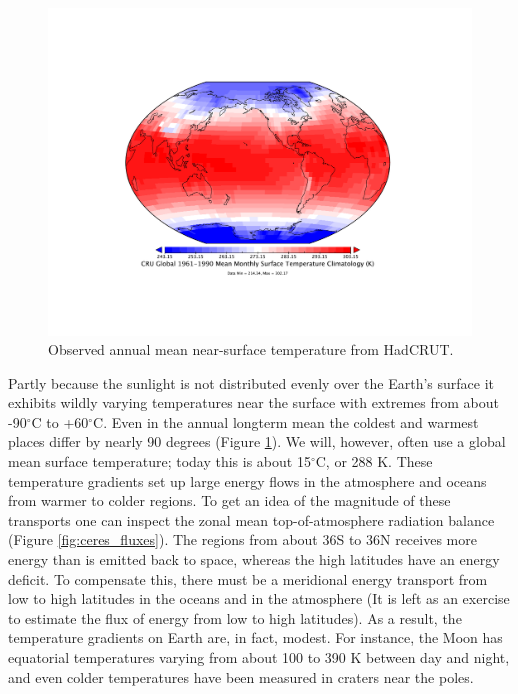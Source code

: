 \documentclass[12pt]{book}
\begin{document}
\begin{figure}
\begin{center}
\includegraphics[width=12 cm]{../external_figures/HadCRUT_absolute_timmean.pdf}
\end{center}
\caption{ Observed annual mean near-surface temperature from HadCRUT. } 
\label{fig:HadCRUT_temperature_map}
\end{figure}

Partly because the sunlight is not distributed evenly over the Earth's surface it exhibits wildly varying temperatures near the surface with extremes from about -90$^\circ$C to +60$^\circ$C. Even in the annual longterm mean the coldest and warmest places differ by nearly 90 degrees (Figure \ref{fig:HadCRUT_temperature_map}). We will, however, often use a global mean surface temperature; today this is about 15$^\circ$C, or 288 K. These temperature gradients set up large energy flows in the atmosphere and oceans from warmer to colder regions. To get an idea of the magnitude of these transports one can inspect the zonal mean top-of-atmosphere radiation balance (Figure \ref{fig:ceres_fluxes}). The regions from about 36S to 36N receives more energy than is emitted back to space, whereas the high latitudes have an energy deficit. To compensate this, there must be a meridional energy transport from low to high latitudes in the oceans and in the atmosphere (It is left as an exercise to estimate the flux of energy from low to high latitudes). As a result, the temperature gradients on Earth are, in fact, modest. For instance, the Moon has equatorial temperatures varying from about 100 to 390 K between day and night, and even colder temperatures have been measured in craters near the poles.
\end{document}
